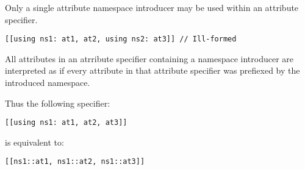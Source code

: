 Only a single attribute namespace introducer may be used within an attribute
specifier.

\begin{lstlisting}
[[using ns1: at1, at2, using ns2: at3]] // Ill-formed
\end{lstlisting}


All attributes in an atrribute specifier containing a namespace introducer are
interpreted as if every attribute in that attribute specifier was prefiexed by
the introduced namespace.

Thus the following specifier:

\begin{lstlisting}
[[using ns1: at1, at2, at3]]
\end{lstlisting}

is equivalent to:

\begin{lstlisting}
[[ns1::at1, ns1::at2, ns1::at3]]
\end{lstlisting}


